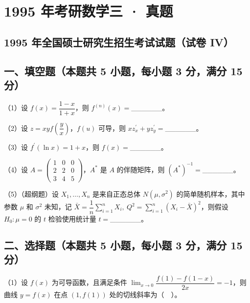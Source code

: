\documentclass[UTF8,12pt]{ctexart}
\begin{document}
\section*{1995 年考研数学三 · 真题}
\subsection*{1995 年全国硕士研究生招生考试试题（试卷 IV）}

\subsection*{一、填空题（本题共 5 小题，每小题 3 分，满分 15 分）}

（1）设 \(\displaystyle f(x)=\dfrac{\displaystyle 1-x}{\displaystyle 1+x}\)，则 \(\displaystyle f^{(n)}(x)=\)\_\_\_\_\_\_。


（2）设 \(\displaystyle z=xyf\left(\dfrac{\displaystyle y}{\displaystyle x}\right)\)，\(\displaystyle f(u)\) 可导，则 \(\displaystyle xz_x^{\prime}+yz_y^{\prime}=\)\_\_\_\_\_\_。


（3）设 \(\displaystyle f^{\prime}(\ln x)=1+x\)，则 \(\displaystyle f(x)=\)\_\_\_\_\_\_。


（4）设 \(\displaystyle A=\begin{pmatrix}1&0&0\\2&2&0\\3&4&5\end{pmatrix}\)，\(\displaystyle A^*\) 是 \(\displaystyle A\) 的伴随矩阵，则 \(\displaystyle (A^*)^{-1}=\)\_\_\_\_\_\_。


（5）（超纲题）设 \(\displaystyle X_1,\allowbreak \ldots,\allowbreak X_n\) 是来自正态总体 \(\displaystyle N(\mu,\allowbreak \sigma^2)\) 的简单随机样本，其中参数 \(\displaystyle \mu\) 和 \(\displaystyle \sigma^2\) 未知，记 \(\displaystyle \bar X=\dfrac{\displaystyle 1}{\displaystyle n}\displaystyle \sum_{i=1}^nX_i,\allowbreak \ Q^2=\displaystyle \sum_{i=1}^n(X_i-\bar X)^2\)，则假设 \(\displaystyle H_0:\mu=0\) 的 \(\displaystyle t\) 检验使用统计量 \(\displaystyle t=\)\_\_\_\_\_\_。


\subsection*{二、选择题（本题共 5 小题，每小题 3 分，满分 15 分）}

（1）设 \(\displaystyle f(x)\) 为可导函数，且满足条件 \(\displaystyle \lim_{x\to0}\dfrac{\displaystyle f(1)-f(1-x)}{\displaystyle 2x}=-1\)，则曲线 \(\displaystyle y=f(x)\) 在点 \(\displaystyle (1,\allowbreak f(1))\) 处的切线斜率为（　）。
\end{document}

